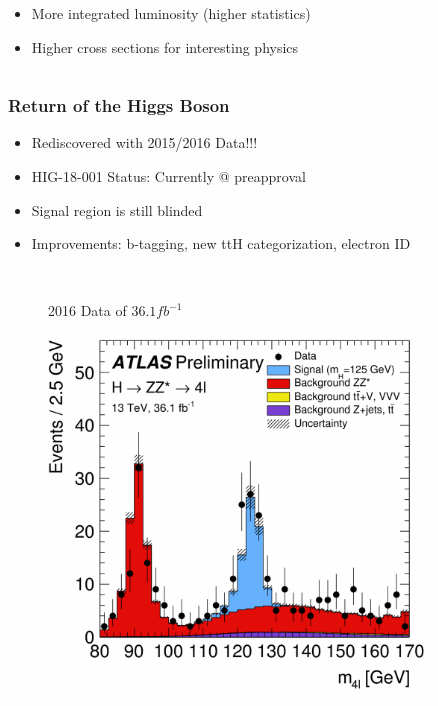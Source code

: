 \documentclass[xcolor={usenames,dvipsnames,svgnames,table}]{beamer}
\begin{document}
\begin{frame}
\begin{columns}
\begin{column}{0.49\textwidth}
\begin{figure}[t]
		\end{figure}
		\begin{itemize}
			\item More integrated luminosity (higher statistics)
			\item Higher cross sections for interesting physics
		\end{itemize}
	\end{column}
	\end{columns}
\end{frame}

\begin{frame}
	\frametitle{Return of the Higgs Boson}
	\begin{itemize}
		\item Rediscovered with 2015/2016 Data!!!
		\item HIG-18-001 Status: Currently @ preapproval
		\item Signal region is still blinded
		\item Improvements: b-tagging, new ttH categorization, electron ID
	\end{itemize}
	\begin{columns}
	\begin{column}{0.49\textwidth}
		\begin{figure}[t]
			\\
			\vspace{-0.5cm}
			\centering \textcolor{color1}{2016 Data of $36.1 fb^{-1}$}\\
			\includegraphics[width=0.9\textwidth]{plots/2016_goldenchannel.png}

\end{figure}
\end{column}
\end{columns}
\end{frame}
\end{document}
